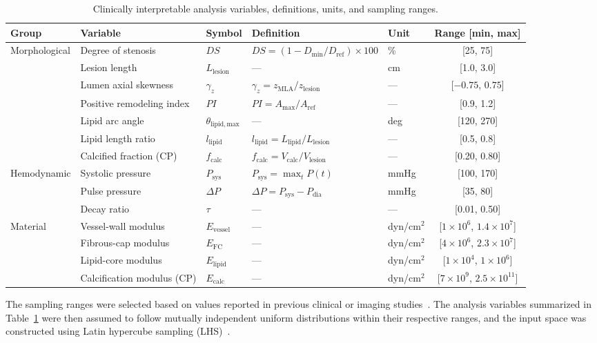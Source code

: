 \documentclass[master,english,final]{kaist-ucs}
\begin{document}
\begin{table}[ht]
\caption[Input variables]{Clinically interpretable analysis variables, definitions, units, and sampling ranges.}
\label{tab:input-vars}
\begin{center}
\small
\begin{tabular}{lllllc}
\hline\hline
Group & Variable & Symbol & Definition & Unit & Range [min, max] \\
\hline
Morphological & Degree of stenosis & $DS$ & $DS=(1-D_\mathrm{min}/D_\mathrm{ref})\times100$ & \% & [25, 75] \\
& Lesion length & $L_\mathrm{lesion}$ & --- & cm & [1.0, 3.0] \\
& Lumen axial skewness & $\gamma_z$ & $\gamma_z=z_\mathrm{MLA}/z_\mathrm{lesion}$ & --- & [$-0.75$, $0.75$] \\
& Positive remodeling index & $PI$ & $PI=A_\mathrm{max}/A_\mathrm{ref}$ & --- & [0.9, 1.2] \\
& Lipid arc angle & $\theta_\mathrm{lipid,max}$ & --- & deg & [120, 270] \\
& Lipid length ratio & $l_\mathrm{lipid}$ & $l_\mathrm{lipid}=L_\mathrm{lipid}/L_\mathrm{lesion}$ & --- & [0.5, 0.8] \\
& Calcified fraction (CP) & $f_\mathrm{calc}$ & $f_\mathrm{calc}=V_\mathrm{calc}/V_\mathrm{lesion}$ & --- & [0.20, 0.80] \\
Hemodynamic & Systolic pressure & $P_\mathrm{sys}$ & $P_\mathrm{sys}=\max_t P(t)$ & mmHg & [100, 170] \\
& Pulse pressure & $\Delta P$ & $\Delta P=P_\mathrm{sys}-P_\mathrm{dia}$ & mmHg & [35, 80] \\
& Decay ratio & $\tau$ & --- & --- & [0.01, 0.50] \\
Material & Vessel-wall modulus & $E_\mathrm{vessel}$ & --- & dyn/cm$^2$ & [$1\times10^6$, $1.4\times10^7$] \\
& Fibrous-cap modulus & $E_\mathrm{FC}$ & --- & dyn/cm$^2$ & [$4\times10^6$, $2.3\times10^7$] \\
& Lipid-core modulus & $E_\mathrm{lipid}$ & --- & dyn/cm$^2$ & [$1\times10^4$, $1\times10^6$] \\
& Calcification modulus (CP) & $E_\mathrm{calc}$ & --- & dyn/cm$^2$ & [$7\times10^9$, $2.5\times10^{11}$] \\
\hline\hline
\end{tabular}
\end{center}
\end{table}

The sampling ranges were selected based on values reported in previous clinical or imaging studies~\cite{ambrose1999, kang2018, vanvelzen2012, choi2015aps, lee2012remodeling, geng2021, wang2017plr, sugiura2021, ryan2021oct_lipid_review, krishnamoorthy2017, aha2024bp, danchin2004aorticpp, parenica2011aorticpp, westerhof2009windkessel, wangtang2021, holzapfel2005, karimi2013, loree1994static, teng2014material, cheng1993, barrett2019, cahalane2018, milzi2021}. The analysis variables summarized in Table~\ref{tab:input-vars} were then assumed to follow mutually independent uniform distributions within their respective ranges, and the input space was constructed using Latin hypercube sampling (LHS)~\cite{mckay1979lhs}.
\end{document}
